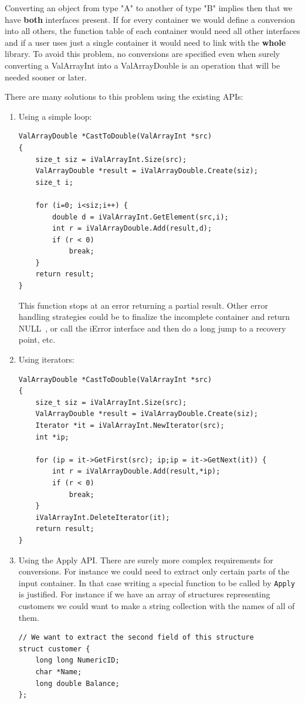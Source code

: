 \documentclass[12pt,a4paper]{memoir} %
\newif\iftth
\newcommand{\Null}{{\iftth \ NULL \else \footnotesize NULL\  \fi}}
\begin{document}
{{Converting an object from type "A" to another of type "B" implies then that we have \textbf{both} interfaces present. If for every container
we would define a conversion into all others, the function table of each container would need all other interfaces and if a user uses just
a single container it would need to link with the \textbf{whole} library. To avoid this problem, no conversions are specified even when surely
converting a ValArrayInt into a ValArrayDouble is an operation that will be needed sooner or later.

There are many solutions to this problem using the existing APIs:
\begin{enumerate}
\item Using a simple loop:
\begin{verbatim}
ValArrayDouble *CastToDouble(ValArrayInt *src)
{
    size_t siz = iValArrayInt.Size(src);
    ValArrayDouble *result = iValArrayDouble.Create(siz);
    size_t i;

    for (i=0; i<siz;i++) {
        double d = iValArrayInt.GetElement(src,i);
        int r = iValArrayDouble.Add(result,d);
        if (r < 0)
            break;
    }
    return result;
}
\end{verbatim}
This function stops at an error returning a partial result. Other error handling strategies could be to finalize the 
incomplete container and return \Null, or call the iError interface and then do a long jump to a recovery point, etc.
\item Using iterators:
\begin{verbatim}
ValArrayDouble *CastToDouble(ValArrayInt *src)
{
    size_t siz = iValArrayInt.Size(src);
    ValArrayDouble *result = iValArrayDouble.Create(siz);
    Iterator *it = iValArrayInt.NewIterator(src);
    int *ip;

    for (ip = it->GetFirst(src); ip;ip = it->GetNext(it)) {
        int r = iValArrayDouble.Add(result,*ip);
        if (r < 0)
            break;
    }
    iValArrayInt.DeleteIterator(it);
    return result;
}
\end{verbatim}
\item Using the Apply API.
There are surely more complex requirements for conversions. For instance we could need to extract only certain parts of the input 
container. In that case
writing a special function to be called by \verb,Apply, is justified. For instance if we have an array of structures representing customers
we could want to make a string collection with the names of all of them. 
\begin{verbatim}
// We want to extract the second field of this structure
struct customer {
    long long NumericID;
    char *Name;
    long double Balance;
};


\end{verbatim}
\end{enumerate}}}
\end{document}
